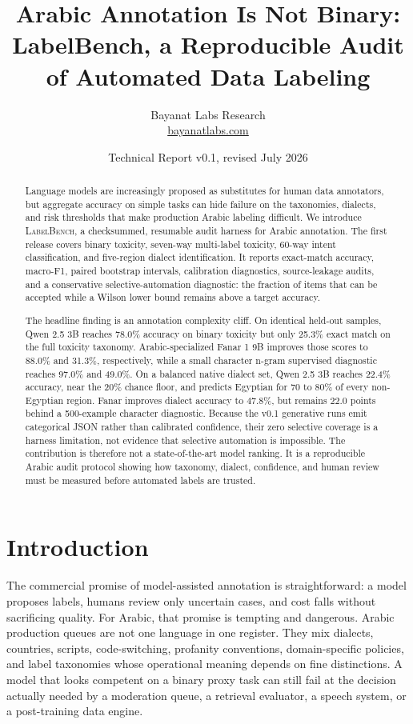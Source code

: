 \documentclass[10pt,twocolumn]{article}
\title{\vspace{-1.5em}\textbf{Arabic Annotation Is Not Binary:}\\
\large LabelBench, a Reproducible Audit of Automated Data Labeling}
\author{Bayanat Labs Research\\
\small \href{https://www.bayanatlabs.com}{bayanatlabs.com}}
\date{Technical Report v0.1, revised July 2026}
\begin{document}
\maketitle

\begin{abstract}
Language models are increasingly proposed as substitutes for human data
annotators, but aggregate accuracy on simple tasks can hide failure on the
taxonomies, dialects, and risk thresholds that make production Arabic labeling
difficult. We introduce \textsc{LabelBench}, a checksummed, resumable audit
harness for Arabic annotation. The first release covers binary toxicity,
seven-way multi-label toxicity, 60-way intent classification, and five-region
dialect identification. It reports exact-match accuracy, macro-F1, paired
bootstrap intervals, calibration diagnostics, source-leakage audits, and a
conservative selective-automation diagnostic: the fraction of items that can
be accepted while a Wilson lower bound remains above a target accuracy.

The headline finding is an annotation complexity cliff. On identical held-out
samples, Qwen 2.5 3B reaches 78.0\% accuracy on binary toxicity but only
25.3\% exact match on the full toxicity taxonomy. Arabic-specialized Fanar 1
9B improves those scores to 88.0\% and 31.3\%, respectively, while a small
character n-gram supervised diagnostic reaches 97.0\% and 49.0\%. On a
balanced native dialect set, Qwen 2.5 3B reaches 22.4\% accuracy, near the
20\% chance floor, and predicts Egyptian for 70 to 80\% of every non-Egyptian
region. Fanar improves dialect accuracy to 47.8\%, but remains 22.0 points
behind a 500-example character diagnostic. Because the v0.1 generative runs
emit categorical JSON rather than calibrated confidence, their zero selective
coverage is a harness limitation, not evidence that selective automation is
impossible. The contribution is therefore not a state-of-the-art model ranking.
It is a reproducible Arabic audit protocol showing how taxonomy, dialect,
confidence, and human review must be measured before automated labels are
trusted.
\end{abstract}

\section{Introduction}
The commercial promise of model-assisted annotation is straightforward: a
model proposes labels, humans review only uncertain cases, and cost falls
without sacrificing quality. For Arabic, that promise is tempting and
dangerous. Arabic production queues are not one language in one register.
They mix dialects, countries, scripts, code-switching, profanity conventions,
domain-specific policies, and label taxonomies whose operational meaning
depends on fine distinctions. A model that looks competent on a binary proxy
task can still fail at the decision actually needed by a moderation queue, a
retrieval evaluator, a speech system, or a post-training data engine.
\end{document}
